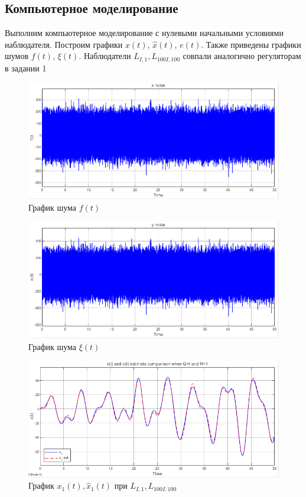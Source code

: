 \documentclass[a4paper, 12pt]{article}
\begin{document}
    \subsection{Компьютерное моделирование}
    Выполним компьютерное моделирование с нулевыми начальными условиями наблюдателя.
    Построим графики $x(t)$, $\hat{x}(t)$, $e(t)$.
    Также приведены графики шумов $f(t)$, $\xi(t)$. Наблюдатели $L_{I,1},L_{100I,100}$ совпали аналогично регуляторам в задании 1
    \begin{figure}[H]
        \centering
        \includegraphics[scale=0.75]{2task_x_noise.png}
        \captionsetup{skip=0pt}
        \caption{График шума $f(t)$}
        \label{fig:2task_x_noise}
    \end{figure}
    \begin{figure}[H]
        \centering
        \includegraphics[scale=0.75]{2task_y_noise.png}
        \captionsetup{skip=0pt}
        \caption{График шума $\xi(t)$}
        \label{fig:2task_y_noise}
    \end{figure}
    \begin{figure}[H]
        \centering
        \includegraphics[scale=0.75]{2task_x1.png}
        \captionsetup{skip=0pt}
        \caption{График $x_1(t),\hat{x}_1(t)$ при $L_{I,1},L_{100I,100}$}
        \label{fig:2task_x1}
    \end{figure}
\end{document}
